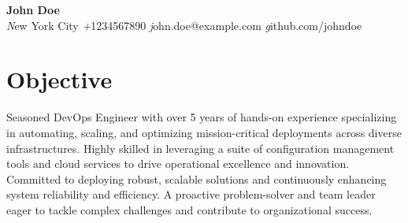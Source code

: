 \documentclass[a4paper,10pt]{article}
\begin{document}
\pagestyle{empty} %

\newcommand{\sectionline}{
  \noindent\makebox[\linewidth]{\rule{\paperwidth}{0.4pt}}
}

\begin{center}
    {\Huge \textbf{John Doe} }\\
    
    \textit New York City \quad
    \textit +1234567890 \quad 
    \textit john.doe@example.com \quad  
    \textit github.com/johndoe \quad 
\end{center}

\sectionline

\section*{Objective}
Seasoned DevOps Engineer with over 5 years of hands-on experience specializing in automating, scaling, and optimizing mission-critical deployments across diverse infrastructures. Highly skilled in leveraging a suite of configuration management tools and cloud services to drive operational excellence and innovation. Committed to deploying robust, scalable solutions and continuously enhancing system reliability and efficiency. A proactive problem-solver and team leader eager to tackle complex challenges and contribute to organizational success.

\end{document}
